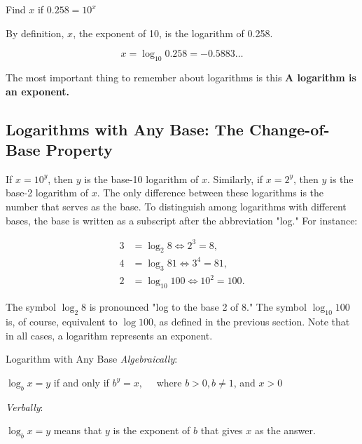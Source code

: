 \begin{example} Find $x$ if $0.258=10^x$

\begin{solution}
   By definition, $x$, the exponent of 10, is the logarithm of 0.258.

    \[
    x=\log_{10} 0.258=-0.5883 \ldots
    \]
\end{solution}
    
\end{example}

\begin{custombox}{The most important thing to remember about logarithms is this}
    \textbf{A logarithm is an exponent.}
\end{custombox}

\subsection*{Logarithms with Any Base: The Change-of-Base Property}
If \(x = 10^y\), then \(y\) is the base-10 logarithm of \(x\). Similarly, if \(x = 2^y\), then \(y\) is the base-2 logarithm of \(x\). The only difference between these logarithms is the number that serves as the base. To distinguish among logarithms with different bases, the base is written as a subscript after the abbreviation "log." For instance:

\[
\begin{aligned}
3 &= \log_2 8 \Leftrightarrow 2^3 = 8, \\
4 &= \log_3 81 \Leftrightarrow 3^4 = 81, \\
2 &= \log_{10} 100 \Leftrightarrow 10^2 = 100.
\end{aligned}
\]

The symbol \(\log_2 8\) is pronounced "log to the base 2 of 8." The symbol \(\log_{10} 100\) is, of course, equivalent to \(\log 100\), as defined in the previous section. Note that in all cases, a logarithm represents an exponent.

\begin{definition}{Logarithm with Any Base}
\textit{Algebraically}:

\hspace{1cm}$\log _b x=y$ if and only if $b^y=x, \quad$ where $b>0, b \neq 1$, and $x>0$

\vspace{0.3cm}

\textit{Verbally}:

\hspace{1cm} $\log _b x=y$ means that $y$ is the exponent of $b$ that gives $x$ as the answer.
    
\end{definition}

